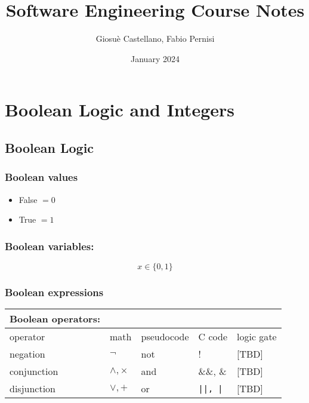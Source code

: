 \documentclass[12pt]{article}
\begin{document}
\title{Software Engineering Course Notes}
\author{Giosuè Castellano, Fabio Pernisi}
\date{January 2024}
\maketitle

\tableofcontents























\newpage
\section{Boolean Logic and Integers}

\subsection{Boolean Logic}

\subsubsection{Boolean values}
\begin{itemize}
\item False \( = 0 \)
\item True \( = 1 \)
\end{itemize}

\subsubsection{Boolean variables:}
\[ x \in \{0, 1\} \]


\subsubsection{Boolean expressions}

\begin{tabular}{l l l l l}
\textbf{Boolean operators:}         &               &       &       & \\
\hline
operator    & math      & pseudocode & C code & logic gate \\
negation    & $\neg$    & not        & !      & [TBD]      \\
conjunction & $\land, \times$  & and         & \&\&, \&     & [TBD]      \\
disjunction & $\lor, +$ & or          & \texttt{||, |}      & [TBD]      \\
\end{tabular}
\vspace{4.5mm}
\end{document}
